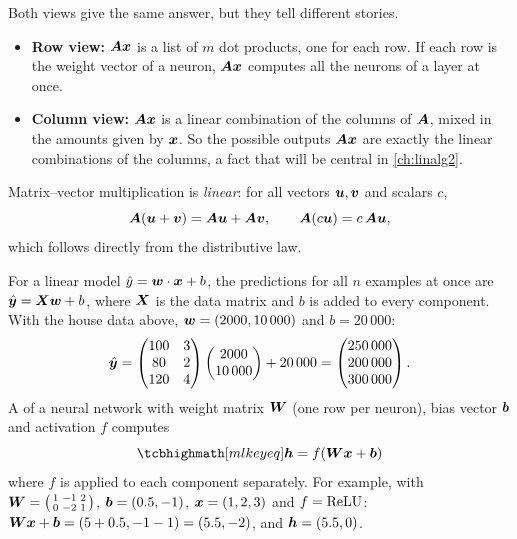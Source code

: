 \begin{intuition}
Both views give the same answer, but they tell different stories.
\begin{itemize}
  \item \textbf{Row view:} $\bm{A}\bm{x}$ is a list of $m$ dot products, one for
    each row. If each row is the weight vector of a neuron, $\bm{A}\bm{x}$ computes
    all the neurons of a layer at once.
  \item \textbf{Column view:} $\bm{A}\bm{x}$ is a linear combination of the columns
    of $\bm{A}$, mixed in the amounts given by $\bm{x}$. So the possible outputs
    $\bm{A}\bm{x}$ are exactly the linear combinations of the columns, a fact that
    will be central in \cref{ch:linalg2}.
\end{itemize}
\end{intuition}

Matrix--vector multiplication is \emph{linear}: for all vectors $\bm{u}, \bm{v}$ and
scalars $c$,
\[
  \bm{A}(\bm{u} + \bm{v}) = \bm{A}\bm{u} + \bm{A}\bm{v}, \qquad \bm{A}(c\bm{u}) = c\,\bm{A}\bm{u} ,
\]
which follows directly from the distributive law.

\begin{mlnote}
For a linear model $\hat y = \bm{w}\cdot\bm{x} + b$, the predictions for all $n$
examples at once are $\hat{\bm{y}} = \bm{X}\bm{w} + b$, where $\bm{X}$ is the data matrix
and $b$ is added to every component. With the house data above,
$\bm{w} = (2000, 10\,000)$ and $b = 20\,000$:
\[
  \hat{\bm{y}} = \begin{pmatrix} 100 & 3\\ 80 & 2\\ 120 & 4 \end{pmatrix}
  \begin{pmatrix} 2000\\ 10\,000 \end{pmatrix} + 20\,000
  = \begin{pmatrix} 250\,000\\ 200\,000\\ 300\,000 \end{pmatrix}.
\]
A  of a neural network with weight matrix
$\bm{W}$ (one row per neuron), bias vector $\bm{b}$ and activation $f$ computes
\[
  \keyeq{\vh = f(\mW\vx + \vb)}
\]
where $f$ is applied to each component separately. For example, with
$\bm{W} = \left(\begin{smallmatrix} 1 & -1 & 2\\ 0 & -2 & 1\end{smallmatrix}\right)$,
$\bm{b} = (0.5, -1)$, $\bm{x} = (1, 2, 3)$ and $f = \operatorname{ReLU}$: $\bm{W}\bm{x} + \bm{b} =
(5 + 0.5, -1 - 1) = (5.5, -2)$, and $\bm{h} = (5.5, 0)$.
\end{mlnote}

